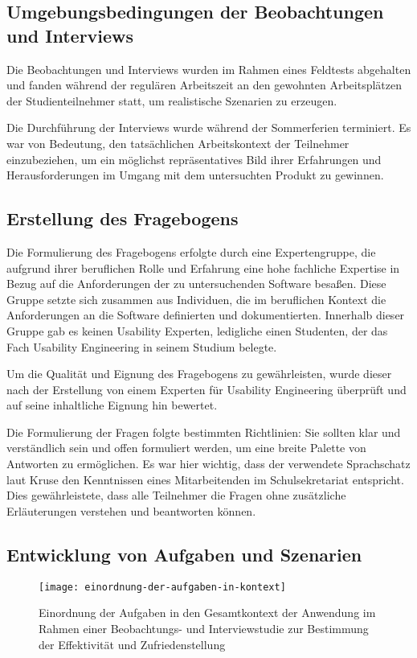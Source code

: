 \subsection{Umgebungsbedingungen der Beobachtungen und Interviews}

Die Beobachtungen und Interviews wurden im Rahmen eines Feldtests abgehalten und fanden während der regulären Arbeitszeit an den gewohnten Arbeitsplätzen der Studienteilnehmer statt, um realistische Szenarien zu erzeugen. 

Die Durchführung der Interviews wurde während der Sommerferien terminiert. Es war von Bedeutung, den tatsächlichen Arbeitskontext der Teilnehmer einzubeziehen, um ein möglichst repräsentatives Bild ihrer Erfahrungen und Herausforderungen im Umgang mit dem untersuchten Produkt zu gewinnen.

\subsection{Erstellung des Fragebogens}

Die Formulierung des Fragebogens erfolgte durch eine Expertengruppe, die aufgrund ihrer beruflichen Rolle und Erfahrung eine hohe fachliche Expertise in Bezug auf die Anforderungen der zu untersuchenden Software besaßen. Diese Gruppe setzte sich zusammen aus Individuen, die im beruflichen Kontext die Anforderungen an die Software definierten und dokumentierten. Innerhalb dieser Gruppe gab es keinen Usability Experten, ledigliche einen Studenten, der das Fach \glqq Usability Engineering\grqq{} in seinem Studium belegte.

Um die Qualität und Eignung des Fragebogens zu gewährleisten, wurde dieser nach der Erstellung von einem Experten für Usability Engineering überprüft und auf seine inhaltliche Eignung hin bewertet.

Die Formulierung der Fragen folgte bestimmten Richtlinien: Sie sollten klar und verständlich sein und offen formuliert werden, um eine breite Palette von Antworten zu ermöglichen. Es war hier wichtig, dass der verwendete Sprachschatz laut Kruse den Kenntnissen eines Mitarbeitenden im Schulsekretariat entspricht.\cite{Kruse_2015} Dies gewährleistete, dass alle Teilnehmer die Fragen ohne zusätzliche Erläuterungen verstehen und beantworten können.

\subsection{Entwicklung von Aufgaben und Szenarien}
\begin{figure}[H]
    \caption{Einordnung der Aufgaben in den Gesamtkontext der Anwendung im Rahmen einer Beobachtungs- und Interviewstudie zur Bestimmung der Effektivität und Zufriedenstellung}
    \texttt{[image: einordnung-der-aufgaben-in-kontext]}
\end{figure}

